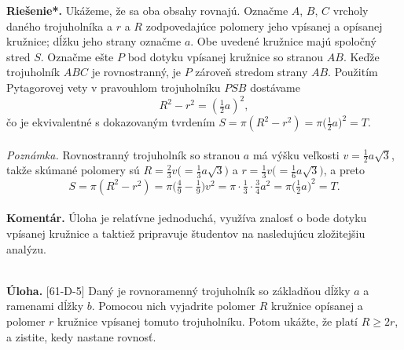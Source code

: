 \documentclass[11pt,a4paper,oneside,final]{book}
\newcommand{\kom}{\textbf{Komentár.} }
\newcommand{\ul}{\textbf{Úloha.} }
\newcommand{\rieh}{\textbf{Riešenie*.} }
\begin{document}
\rieh Ukážeme, že sa oba obsahy rovnajú. Označme $A$, $B$, $C$ vrcholy daného trojuholníka a $r$ a $R$ zodpovedajúce polomery jeho vpísanej a opísanej kružnice; dĺžku jeho strany označme $a$. Obe uvedené kružnice majú spoločný stred $S$. Označme ešte $P$ bod dotyku vpísanej kružnice so stranou $AB$. Keďže trojuholník $ABC$ je rovnostranný, je $P$ zároveň stredom strany $AB$. Použitím Pytagorovej vety v pravouhlom trojuholníku $PSB$ dostávame
$$R^2 - r^2=  (\tfrac{1}{2}a)^2,$$
čo je ekvivalentné s dokazovaným tvrdením $S = \pi (R^2 - r^2) = \pi \big( \frac{1}{2}a\big)^2= T$.\\
\\
\textit{Poznámka.} Rovnostranný trojuholník so stranou $a$ má výšku veľkosti $v = \frac{1}{2}a \sqrt{3}$, takže skúmané polomery sú $R =\frac{2}{3}v \big(=\frac{1}{3}a\sqrt{3}\big)$ a $r =\frac{1}{3}v \big(=\frac{1}{6}a\sqrt{3}\big)$, a preto
$$S = \pi ( R^2 - r^2) = \pi \big( \tfrac{4}{9} -\tfrac{1}{9})v^2= \pi \cdot \tfrac{1}{3}\cdot\tfrac{3}{4}a^2= \pi \big( \tfrac{1}{2}a\big)^2= T.$$
\\
\kom Úloha je relatívne jednoduchá, využíva znalosť o bode dotyku vpísanej kružnice a taktiež pripravuje študentov na nasledujúcu zložitejšiu analýzu. \\
\\
\begin{tcolorbox}[breakable,notitle,boxrule=0pt,colback=light-gray,colframe=light-gray]\ul [61-D-5] Daný je rovnoramenný trojuholník so základňou dĺžky $a$ a ramenami dĺžky $b$. Pomocou nich vyjadrite polomer $R$ kružnice opísanej a polomer $r$ kružnice vpísanej tomuto trojuholníku. Potom ukážte, že platí $R \geq 2r$, a zistite, kedy nastane rovnosť.

\end{tcolorbox}
\end{document}
